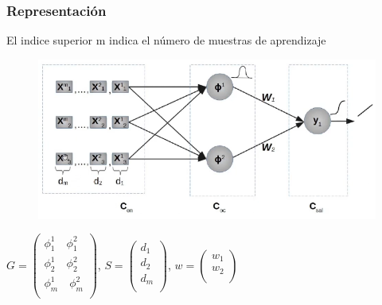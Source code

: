 \documentclass[
	11pt, %
]{beamer}
\begin{document}
\begin{frame}
  \frametitle{Representación}
  El indice superior m indica el número de muestras de aprendizaje
  \begin{figure}
    \includegraphics[width=0.7\linewidth]{rbradial.png}
  \end{figure}
  $G= \begin{pmatrix}
    \phi_{1}^{1} \quad \phi_{1}^{2}\\
    \phi_{2}^{1} \quad \phi_{2}^{2}\\
    \phi_{m}^{1} \quad \phi_{m}^{2}\\
  \end{pmatrix}  $,
  $S= \begin{pmatrix}
    d_{1}\\
    d_{2}\\
    d_{m}\\
  \end{pmatrix}$,
  $w=\begin{pmatrix}
  w_{1}\\
  w_{2}\\
  \end{pmatrix}$
\end{frame}
\end{document}
